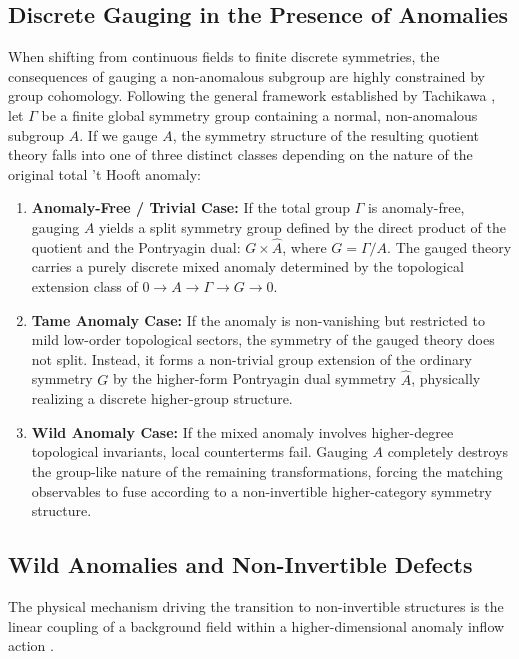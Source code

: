 \documentclass[aps,preprint,nofootinbib,preprintnumbers,eqsecnum,superscriptaddress]{revtex4}
\numberwithin{equation}{section}
\begin{document}
\subsection{Discrete Gauging in the Presence of Anomalies}
\label{sec:discrete_gauging_anomalies}

When shifting from continuous fields to finite discrete symmetries, the consequences of gauging a non-anomalous subgroup are highly constrained by group cohomology. Following the general framework established by Tachikawa \cite{Tachikawa_2020}, let $\Gamma$ be a finite global symmetry group containing a normal, non-anomalous subgroup $A$. If we gauge $A$, the symmetry structure of the resulting quotient theory falls into one of three distinct classes depending on the nature of the original total 't Hooft anomaly:

\begin{enumerate}[\itshape i)]
    \item \textbf{Anomaly-Free / Trivial Case:} If the total group $\Gamma$ is anomaly-free, gauging $A$ yields a split symmetry group defined by the direct product of the quotient and the Pontryagin dual: $G \times \hat{A}$, where $G = \Gamma/A$. The gauged theory carries a purely discrete mixed anomaly determined by the topological extension class of $0 \to A \to \Gamma \to G \to 0$.
    \item \textbf{Tame Anomaly Case:} If the anomaly is non-vanishing but restricted to mild low-order topological sectors, the symmetry of the gauged theory does not split. Instead, it forms a non-trivial group extension of the ordinary symmetry $G$ by the higher-form Pontryagin dual symmetry $\hat{A}$, physically realizing a discrete higher-group structure.
    \item \textbf{Wild Anomaly Case:} If the mixed anomaly involves higher-degree topological invariants, local counterterms fail. Gauging $A$ completely destroys the group-like nature of the remaining transformations, forcing the matching observables to fuse according to a non-invertible higher-category symmetry structure.
\end{enumerate}

\subsection{Wild Anomalies and Non-Invertible Defects}
\label{sec:mix_anom_noninv_defect}

The physical mechanism driving the transition to non-invertible structures is the linear coupling of a background field within a higher-dimensional anomaly inflow action \cite{Kaidi_2022, Bhardwaj_2023, schafernameki2023ictplecturesnoninvertiblegeneralized}. 
\end{document}
